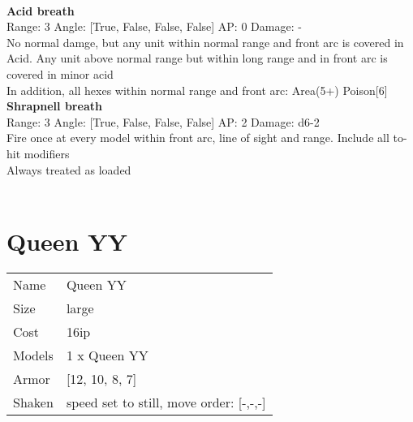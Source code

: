 \ \\
{\bf Acid breath } \\



Range: 3  Angle: [True, False, False, False] AP: 0 Damage: - \\
No normal damge, but any unit within normal range and front arc is covered in Acid. Any unit above normal range but within long range and in front arc is covered in minor acid\\ 
In addition, all hexes within normal range and front arc: Area(5+) Poison[6]\\ 




{\bf Shrapnell breath } \\



Range: 3  Angle: [True, False, False, False] AP: 2 Damage: d6-2 \\
Fire once at every model within front arc, line of sight and range. Include all to-hit modifiers\\ 
Always treated as loaded\\ 




 
\ \\













\clearpage

\section{ Queen YY }

\begin{tabular}{ll}
  Name & Queen YY \\
  Size & large\\
  Cost & 16ip\\
  Models & 1 x Queen YY\\
  Armor & [12, 10, 8, 7]\\
  Shaken & speed set to still, move order: [-,-,-]\\
\end{tabular}

\noindent 

